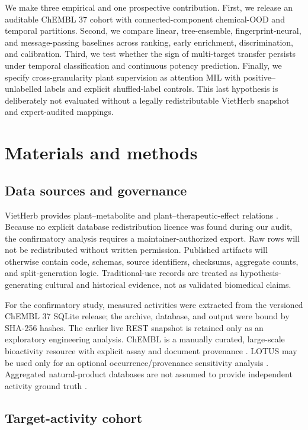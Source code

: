 \documentclass[11pt]{article}
\begin{document}
We make three empirical and one prospective contribution. First, we release an
auditable ChEMBL 37 cohort with connected-component chemical-OOD and temporal
partitions. Second, we compare linear, tree-ensemble, fingerprint-neural, and
message-passing baselines across ranking, early enrichment, discrimination, and
calibration. Third, we test whether the sign of multi-target transfer persists
under temporal classification and continuous potency prediction. Finally, we
specify cross-granularity plant supervision as attention MIL with
positive--unlabelled labels and explicit shuffled-label controls. This last
hypothesis is deliberately not evaluated without a legally redistributable
VietHerb snapshot and expert-audited mappings.

\section{Materials and methods}

\subsection{Data sources and governance}

VietHerb provides plant--metabolite and plant--therapeutic-effect relations
\citep{nguyenvo2019vietherb}. Because no explicit database redistribution
licence was found during our audit, the confirmatory analysis requires a
maintainer-authorized export. Raw rows will not be redistributed without
written permission. Published artifacts will otherwise contain code, schemas,
source identifiers, checksums, aggregate counts, and split-generation logic.
Traditional-use records are treated as hypothesis-generating cultural and
historical evidence, not as validated biomedical claims.

For the confirmatory study, measured activities were extracted from the
versioned ChEMBL 37 SQLite release; the archive, database, and output were
bound by SHA-256 hashes. The earlier live REST snapshot is retained only as an
exploratory engineering analysis. ChEMBL is a
manually curated, large-scale bioactivity resource with explicit assay and
document provenance \citep{zdrazil2024chembl}. LOTUS may be used only for an
optional occurrence/provenance sensitivity analysis
\citep{rutz2022lotus}. Aggregated natural-product databases are not assumed to
provide independent activity ground truth \citep{chandrasekhar2025coconut}.

\subsection{Target-activity cohort}
\end{document}
